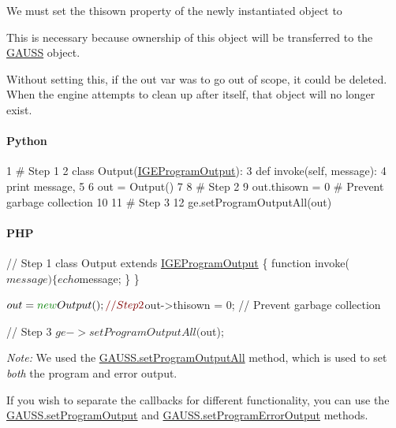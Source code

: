 We must set the {\ttfamily thisown} property of the newly instantiated object to {}

This is necessary because ownership of this object will be transferred to the \hyperlink{class_g_a_u_s_s}{G\-A\-U\-S\-S} object.

Without setting this, if the {\ttfamily out} var was to go out of scope, it could be deleted. When the engine attempts to clean up after itself, that object will no longer exist.

\paragraph*{Python}


\begin{DoxyCode}
1 \textcolor{comment}{# Step 1}
2 \textcolor{keyword}{class }Output(\hyperlink{class_i_g_e_program_output}{IGEProgramOutput}):
3     \textcolor{keyword}{def }invoke(self, message):
4         \textcolor{keywordflow}{print} message,
5 
6 out = Output()
7 
8 \textcolor{comment}{# Step 2}
9 out.thisown = 0 \textcolor{comment}{# Prevent garbage collection}
10 
11 \textcolor{comment}{# Step 3}
12 ge.setProgramOutputAll(out)
\end{DoxyCode}
 \paragraph*{P\-H\-P}


\begin{DoxyCode}
\textcolor{comment}{// Step 1}
\textcolor{keyword}{class }Output \textcolor{keyword}{extends} \hyperlink{class_i_g_e_program_output}{IGEProgramOutput} \{
    \textcolor{keyword}{function} invoke($message) \{
        echo $message;
    \}
\}

$out = \textcolor{keyword}{new} Output();

\textcolor{comment}{// Step 2}
$out->thisown = 0; \textcolor{comment}{// Prevent garbage collection}

\textcolor{comment}{// Step 3}
$ge->setProgramOutputAll($out);
\end{DoxyCode}


{\itshape Note\-:} We used the \hyperlink{class_g_a_u_s_s_a0b8379c48d677e05aeab433dba66fbb6}{G\-A\-U\-S\-S.\-set\-Program\-Output\-All} method, which is used to set {\itshape both} the program and error output.

If you wish to separate the callbacks for different functionality, you can use the \hyperlink{class_g_a_u_s_s_a7f0dc6b5b307aa06c347f9c6a9fdacab}{G\-A\-U\-S\-S.\-set\-Program\-Output} and \hyperlink{class_g_a_u_s_s_abd75266b2c4075da75163fe95b013ef3}{G\-A\-U\-S\-S.\-set\-Program\-Error\-Output} methods.


